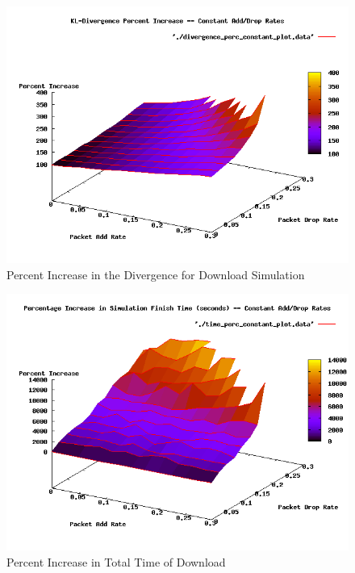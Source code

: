 \documentclass{article}
\begin{document}
\begin{figure}
	\centering
		\includegraphics[scale=0.5]{./plots/divergence_perc_constant_plot.png}
	\caption{Percent Increase in the Divergence for Download Simulation}
	\label{fig:divpercplot}
\end{figure}
\begin{figure}
	\centering
		\includegraphics[scale=0.5]{./plots/time_perc_constant_plot.png}
	\caption{Percent Increase in Total Time of Download}
	\label{fig:timepercplot}
\end{figure}
\end{document}
